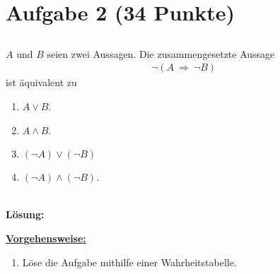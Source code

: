 \section*{Aufgabe 2 (34 Punkte)}
\vspace{0.4cm}
\subsection*{}
$ A $ und $ B $ seien zwei Aussagen. Die zusammengesetzte Aussage
\begin{align*}
	\neg (A \ \Rightarrow \ \neg B)
\end{align*}
ist äquivalent zu 
\renewcommand{\labelenumi}{(\alph{enumi})}
\begin{enumerate}
	\item $ A \vee B $.
	\item $ A \wedge B $.
	\item $ (\neg A) \vee (\neg B)$
	\item $ (\neg A) \wedge (\neg B)$.
\end{enumerate}\ \\
\textbf{Lösung:}
\begin{mdframed}
\underline{\textbf{Vorgehensweise:}}
\renewcommand{\labelenumi}{\theenumi.}
\begin{enumerate}
\item Löse die Aufgabe mithilfe einer Wahrheitstabelle.
\end{enumerate}
\end{mdframed}

